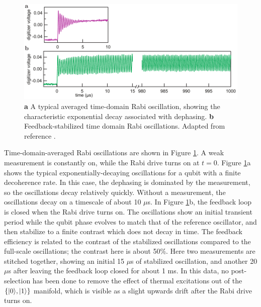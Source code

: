 \begin{figure}
\begin{center}
	\includegraphics[width = 6in]{qfb_results_chapter/time_domain}
\end{center}
\caption[Stabilized time-domain Rabi oscillations]{\textbf{a} A typical averaged time-domain Rabi oscillation, showing the characteristic exponential decay associated with dephasing. \textbf{b}  Feedback-stabilized time domain Rabi oscillations.  Adapted from reference \cite{vijay_stabilizing_2012}.}
\label{fig:time_domain}
\end{figure}

Time-domain-averaged Rabi oscillations are shown in Figure \ref{fig:time_domain}.  A weak measurement is constantly on, while the Rabi drive turns on at $t = 0$.  Figure \ref{fig:time_domain}a shows the typical exponentially-decaying oscillations for a qubit with a finite decoherence rate.  In this case, the dephasing is dominated by the measurement, so the oscillations decay relatively quickly.  Without a measurement, the oscillations decay on a timescale of about 10 $\mu$s.  In Figure \ref{fig:time_domain}b, the feedback loop is closed when the Rabi drive turns on.  The oscillations show an initial transient period while the qubit phase evolves to match that of the reference oscillator, and then stabilize to a finite contrast which does not decay in time.  The feedback efficiency is related to the contrast of the stabilized oscillations compared to the full-scale oscillations; the contrast here is about 50\%.  Here two measurements are stitched together, showing an initial 15 $\mu$s of stabilized oscillation, and another 20 $\mu$s after leaving the feedback loop closed for about 1 ms.  In this data, no post-selection has been done to remove the effect of thermal excitations out of the $ \{ |0\rangle,|1\rangle\}$ manifold, which is visible as a slight upwards drift after the Rabi drive turns on.

